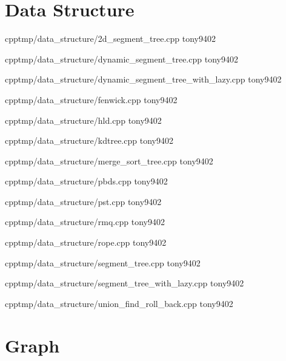 \section{Data Structure}


{}
{}
{}
{cpp}{tmp/data_structure/2d_segment_tree.cpp}
{tony9402}



{}
{}
{}
{cpp}{tmp/data_structure/dynamic_segment_tree.cpp}
{tony9402}



{}
{}
{}
{cpp}{tmp/data_structure/dynamic_segment_tree_with_lazy.cpp}
{tony9402}



{}
{}
{}
{cpp}{tmp/data_structure/fenwick.cpp}
{tony9402}



{}
{}
{}
{cpp}{tmp/data_structure/hld.cpp}
{tony9402}



{}
{}
{}
{cpp}{tmp/data_structure/kdtree.cpp}
{tony9402}



{}
{}
{}
{cpp}{tmp/data_structure/merge_sort_tree.cpp}
{tony9402}



{}
{}
{}
{cpp}{tmp/data_structure/pbds.cpp}
{tony9402}



{}
{}
{}
{cpp}{tmp/data_structure/pst.cpp}
{tony9402}



{}
{}
{}
{cpp}{tmp/data_structure/rmq.cpp}
{tony9402}



{}
{}
{}
{cpp}{tmp/data_structure/rope.cpp}
{tony9402}



{}
{}
{}
{cpp}{tmp/data_structure/segment_tree.cpp}
{tony9402}



{}
{}
{}
{cpp}{tmp/data_structure/segment_tree_with_lazy.cpp}
{tony9402}



{}
{}
{}
{cpp}{tmp/data_structure/union_find_roll_back.cpp}
{tony9402}


\section{Graph}


